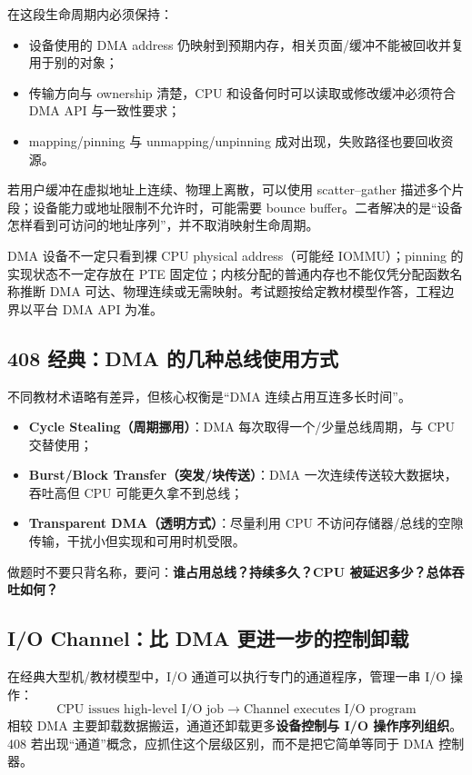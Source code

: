 \documentclass[UTF8,fontset=fandol,11pt,a4paper]{ctexart}
\newcommand{\kw}[1]{\textbf{#1}}
\newcommand{\arr}{\;\longrightarrow\;}
\begin{document}
在这段生命周期内必须保持：
\begin{itemize}
  \item 设备使用的 DMA address 仍映射到预期内存，相关页面/缓冲不能被回收并复用于别的对象；
  \item 传输方向与 ownership 清楚，CPU 和设备何时可以读取或修改缓冲必须符合 DMA API 与一致性要求；
  \item mapping/pinning 与 unmapping/unpinning 成对出现，失败路径也要回收资源。
\end{itemize}

若用户缓冲在虚拟地址上连续、物理上离散，可以使用 scatter--gather 描述多个片段；设备能力或地址限制不允许时，可能需要 bounce buffer。二者解决的是“设备怎样看到可访问的地址序列”，并不取消映射生命周期。

\begin{warn}[三个不能绝对化的旧稿说法]
DMA 设备不一定只看到裸 CPU physical address（可能经 IOMMU）；pinning 的实现状态不一定存放在 PTE 固定位；内核分配的普通内存也不能仅凭分配函数名称推断 DMA 可达、物理连续或无需映射。考试题按给定教材模型作答，工程边界以平台 DMA API 为准。
\end{warn}

\subsection{408 经典：DMA 的几种总线使用方式}
不同教材术语略有差异，但核心权衡是“DMA 连续占用互连多长时间”。
\begin{itemize}
  \item \kw{Cycle Stealing（周期挪用）}：DMA 每次取得一个/少量总线周期，与 CPU 交替使用；
  \item \kw{Burst/Block Transfer（突发/块传送）}：DMA 一次连续传送较大数据块，吞吐高但 CPU 可能更久拿不到总线；
  \item \kw{Transparent DMA（透明方式）}：尽量利用 CPU 不访问存储器/总线的空隙传输，干扰小但实现和可用时机受限。
\end{itemize}
做题时不要只背名称，要问：\kw{谁占用总线？持续多久？CPU 被延迟多少？总体吞吐如何？}

\subsection{I/O Channel：比 DMA 更进一步的控制卸载}
在经典大型机/教材模型中，I/O 通道可以执行专门的通道程序，管理一串 I/O 操作：
\[
\boxed{\text{CPU issues high-level I/O job}\arr\text{Channel executes I/O program}}
\]
相较 DMA 主要卸载数据搬运，通道还卸载更多\kw{设备控制与 I/O 操作序列组织}。408 若出现“通道”概念，应抓住这个层级区别，而不是把它简单等同于 DMA 控制器。
\end{document}
